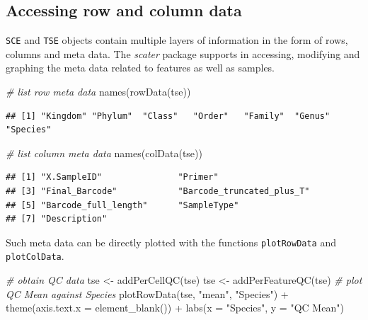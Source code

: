 \documentclass[
]{book}
\newenvironment{Shaded}{\begin{snugshade}}{\end{snugshade}}
\newcommand{\AttributeTok}[1]{\textcolor[rgb]{0.77,0.63,0.00}{#1}}
\newcommand{\CommentTok}[1]{\textcolor[rgb]{0.56,0.35,0.01}{\textit{#1}}}
\newcommand{\FunctionTok}[1]{\textcolor[rgb]{0.00,0.00,0.00}{#1}}
\newcommand{\NormalTok}[1]{#1}
\newcommand{\OtherTok}[1]{\textcolor[rgb]{0.56,0.35,0.01}{#1}}
\newcommand{\SpecialCharTok}[1]{\textcolor[rgb]{0.00,0.00,0.00}{#1}}
\newcommand{\StringTok}[1]{\textcolor[rgb]{0.31,0.60,0.02}{#1}}
\begin{document}
\hypertarget{accessing-row-and-column-data}{%
\subsection{Accessing row and column data}\label{accessing-row-and-column-data}}

\texttt{SCE} and \texttt{TSE} objects contain multiple layers of information in the form of
rows, columns and meta data. The \emph{scater} package supports in accessing,
modifying and graphing the meta data related to features as well as samples.

\begin{Shaded}
\begin{Highlighting}[]
\CommentTok{\# list row meta data}
\FunctionTok{names}\NormalTok{(}\FunctionTok{rowData}\NormalTok{(tse))}
\end{Highlighting}
\end{Shaded}

\begin{verbatim}
## [1] "Kingdom" "Phylum"  "Class"   "Order"   "Family"  "Genus"   "Species"
\end{verbatim}

\begin{Shaded}
\begin{Highlighting}[]
\CommentTok{\# list column meta data}
\FunctionTok{names}\NormalTok{(}\FunctionTok{colData}\NormalTok{(tse))}
\end{Highlighting}
\end{Shaded}

\begin{verbatim}
## [1] "X.SampleID"               "Primer"                  
## [3] "Final_Barcode"            "Barcode_truncated_plus_T"
## [5] "Barcode_full_length"      "SampleType"              
## [7] "Description"
\end{verbatim}

Such meta data can be directly plotted with the functions \texttt{plotRowData} and \texttt{plotColData}.

\begin{Shaded}
\begin{Highlighting}[]
\CommentTok{\# obtain QC data}
\NormalTok{tse }\OtherTok{\textless{}{-}} \FunctionTok{addPerCellQC}\NormalTok{(tse)}
\NormalTok{tse }\OtherTok{\textless{}{-}} \FunctionTok{addPerFeatureQC}\NormalTok{(tse)}
\CommentTok{\# plot QC Mean against Species}
\FunctionTok{plotRowData}\NormalTok{(tse, }\StringTok{"mean"}\NormalTok{, }\StringTok{"Species"}\NormalTok{) }\SpecialCharTok{+}
  \FunctionTok{theme}\NormalTok{(}\AttributeTok{axis.text.x =} \FunctionTok{element\_blank}\NormalTok{()) }\SpecialCharTok{+}
  \FunctionTok{labs}\NormalTok{(}\AttributeTok{x =} \StringTok{"Species"}\NormalTok{, }\AttributeTok{y =} \StringTok{"QC Mean"}\NormalTok{)}
\end{Highlighting}
\end{Shaded}
\end{document}
